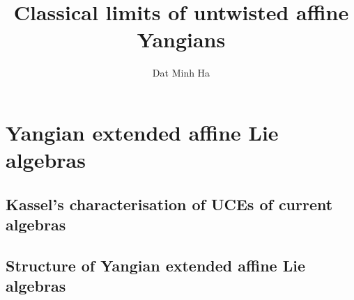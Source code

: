 

\setcounter{chapter}{-1}
\setcounter{section}{-1}


\newcommand{\toroidal}{\t}
\newcommand{\extendedtoroidal}{\hat{\t}}
\newcommand{\simpleroots}{\mathbb{I}}
\renewcommand{\positive}{+} 
\renewcommand{\negative}{-}
\newcommand{\yangian}{\rmY}
\newcommand{\formalyangian}{\rmY_{\hbar}}



    \title{Classical limits of untwisted affine Yangians}
    
    \author{Dat Minh Ha}
    \maketitle
    
    {
      \hypersetup{} 
      \dominitoc
      \tableofcontents %
    }

    \newpage

    \listoftodos

    \newpage

    

    \newpage

    \part{Yangian extended affine Lie algebras}
        \chapter{Kassel's characterisation of UCEs of current algebras}
            \begin{abstract}
                
            \end{abstract}
    
            \minitoc
        
           
    
           
    
        \newpage
    
        \chapter{Structure of Yangian extended affine Lie algebras}
            \begin{abstract}
                
            \end{abstract}
    
